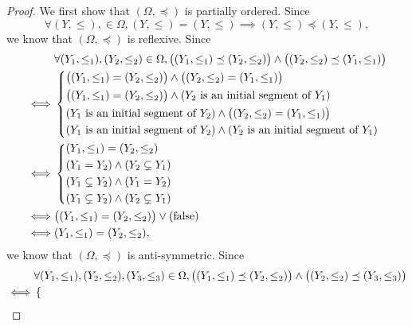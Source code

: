 \begin{proof}
  We first show that \((\Omega, \preceq)\) is partially ordered.
  Since
  \[
    \forall (Y, \leq), \in \Omega, (Y, \leq) = (Y, \leq) \implies (Y, \leq) \preceq (Y, \leq),
  \]
  we know that \((\Omega, \preceq)\) is reflexive.
  Since
  \begin{align*}
         & \forall (Y_1, \leq_1), (Y_2, \leq_2) \in \Omega, \big((Y_1, \leq_1) \preceq (Y_2, \leq_2)\big) \land \big((Y_2, \leq_2) \preceq (Y_1, \leq_1)\big) \\
    \iff & \begin{dcases}
             \big((Y_1, \leq_1) = (Y_2, \leq_2)\big) \land \big((Y_2, \leq_2) = (Y_1, \leq_1)\big)     \\
             \big((Y_1, \leq_1) = (Y_2, \leq_2)\big) \land (Y_2 \text{ is an initial segment of } Y_1) \\
             (Y_1 \text{ is an initial segment of } Y_2) \land \big((Y_2, \leq_2) = (Y_1, \leq_1)\big) \\
             (Y_1 \text{ is an initial segment of } Y_2) \land (Y_2 \text{ is an initial segment of } Y_1)
           \end{dcases}                                                       \\
    \iff & \begin{dcases}
             (Y_1, \leq_1) = (Y_2, \leq_2)          \\
             (Y_1 = Y_2) \land (Y_2 \subsetneq Y_1) \\
             (Y_1 \subsetneq Y_2) \land (Y_1 = Y_2) \\
             (Y_1 \subsetneq Y_2) \land (Y_2 \subsetneq Y_1)
           \end{dcases}                                                                                                     \\
    \iff & \big((Y_1, \leq_1) = (Y_2, \leq_2)\big) \lor (\text{false})                                                                                        \\
    \iff & (Y_1, \leq_1) = (Y_2, \leq_2),
  \end{align*}
  we know that \((\Omega, \preceq)\) is anti-symmetric.
  Since
  \begin{align*}
         & \forall (Y_1, \leq_1), (Y_2, \leq_2), (Y_3, \leq_3) \in \Omega, \big((Y_1, \leq_1) \preceq (Y_2, \leq_2)\big) \land \big((Y_2, \leq_2) \preceq (Y_3, \leq_3)\big) \\
    \iff & \begin{dcases}

\end{dcases}
\end{align*}
\end{proof}
